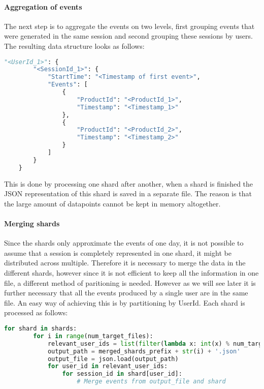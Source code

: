 \paragraph{Aggregation of events}
The next step is to aggregate the events on two levels, first grouping events that were generated in the same session and second grouping these sessions by users.
The resulting data structure looks as follows:

\begin{minipage}{\linewidth}
    \begin{lstlisting}[language=Python,frame=single,caption=Data Structure for user-events,label=code:user-events]
    "<UserId_1>": {
        "<SessionId_1>": {
            "StartTime": "<Timestamp of first event>",
            "Events": [
                {
                    "ProductId": "<ProductId_1>",
                    "Timestamp": "<Timestamp_1>"
                },
                {
                    "ProductId": "<ProductId_2>",
                    "Timestamp": "<Timestamp_2>"
                }
            ]
        }
    }
    \end{lstlisting}
\end{minipage}
This is done by processing one shard after another, when a shard is finished the JSON representation of this shard is saved in a separate file.
The reason is that the large amount of datapoints cannot be kept in memory altogether.

\paragraph{Merging shards}
Since the shards only approximate the events of one day, it is not possible to assume that a session is completely represented in one shard, it might be distributed across multiple.
Therefore it is necessary to merge the data in the different shards, however since it is not efficient to keep all the information in one file, a different method of paritioning is needed.
However as we will see later it is further necessary that all the events produced by a single user are in the same file.
An easy way of achieving this is by partitioning by UserId.
Each shard is processed as follows:

\begin{minipage}{\linewidth}
    \begin{lstlisting}[language=Python,frame=single,caption=Merging shards,label=code:merging-shards]
    for shard in shards:
        for i in range(num_target_files):
            relevant_user_ids = list(filter(lambda x: int(x) % num_target_files == i, shard.keys()))
            output_path = merged_shards_prefix + str(i) + '.json'
            output_file = json.load(output_path)
            for user_id in relevant_user_ids:
                for session_id in shard[user_id]:
                    # Merge events from output_file and shard
    \end{lstlisting}
\end{minipage}

